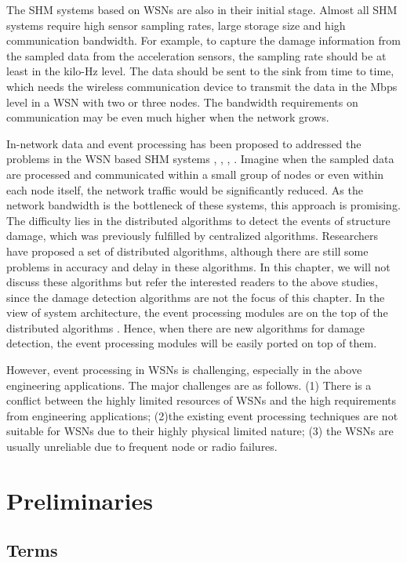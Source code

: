 \documentclass[12pt,journal,draftcls,letterpaper,onecolumn]{elsarticle}
\begin{document}
The SHM systems based on WSNs are also in their initial stage.
Almost all SHM systems require high sensor sampling rates, large
storage size and high communication bandwidth. For example, to
capture the damage information from the sampled data from the
acceleration sensors, the sampling rate should be at least in the
kilo-Hz level. The data should be sent to the sink from time to
time, which needs the wireless communication device to transmit the
data in the Mbps level in a WSN with two or three nodes. The
bandwidth requirements on communication may be even much higher when
the network grows.

In-network data and event processing has been proposed to addressed
the problems in the WSN based SHM systems \cite{Mechitov},
\cite{pakzad:89}, \cite{DBLP:journals/ijsnet/WangCLCXL09},
\cite{Low-Power05}. Imagine when the sampled data are processed and
communicated within a small group of nodes or even within each node
itself, the network traffic would be significantly reduced. As the
network bandwidth is the bottleneck of these systems, this approach
is promising. The difficulty lies in the distributed algorithms to
detect the events of structure damage, which was previously
fulfilled by centralized algorithms. Researchers have proposed a set
of distributed algorithms, although there are still some problems in
accuracy and delay in these algorithms. In this chapter, we will not
discuss these algorithms but refer the interested readers to the
above studies, since the damage detection algorithms are not the
focus of this chapter. In the view of system architecture, the event
processing modules are on the top of the distributed algorithms
\cite{Messina}. Hence, when there are new algorithms for damage
detection, the event processing modules will be easily ported on top
of them.


However, event processing in WSNs is challenging, especially in the
above engineering applications. The major challenges are as follows.
(1) There is a conflict between the highly limited resources of WSNs
and the high requirements from engineering applications; (2)the
existing event processing techniques are not suitable for WSNs due
to their highly physical limited nature; (3) the WSNs are usually
unreliable due to frequent node or radio failures.

\section{Preliminaries}

\subsection{Terms}
\end{document}
